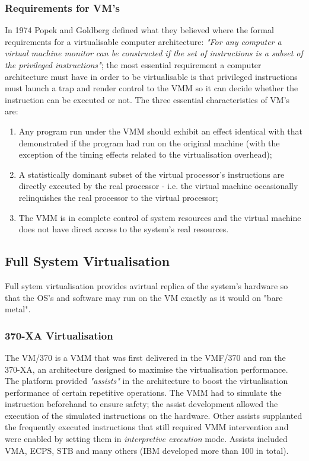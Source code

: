 \subsubsection{Requirements for VM's} 
In 1974 Popek and Goldberg defined what they believed where the formal requirements for a virtualisable computer
architecture: \textit{"For any computer a virtual machine monitor can be constructed if the set of instructions is a
subset of the privileged instructions"}; the most essential requirement a computer architecture must have in order to
be virtualisable is that privileged instructions must launch a trap and render control to the VMM so it can decide
whether the instruction can be executed or not. The three essential characteristics of VM's are:
\begin{enumerate}
    \item Any program run under the VMM should exhibit an effect identical with that demonstrated if the program had
        run on the original machine (with the exception of the timing effects related to the virtualisation overhead);
    \item A statistically dominant subset of the virtual processor's instructions are directly executed by the real
        processor - i.e. the virtual machine occasionally relinquishes the real processor to the virtual processor; 
    \item The VMM is in complete control of system resources and the virtual machine does not have direct access to the
        system's real resources.
\end{enumerate}
\subsection{Full System Virtualisation}
Full sytem virtualisation provides avirtual replica of the system's hardware so that the OS's and software may run on
the VM exactly as it would on "bare metal".
\subsubsection{370-XA Virtualisation}
The VM/370 is a VMM that was first delivered in the VMF/370 and ran the 370-XA, an architecture designed to maximise 
the virtualisation performance. The platform provided \textit{"assists"} in the architecture to boost the
virtualisation performance of certain repetitive operations. The VMM had to simulate the instruction beforehand to 
ensure safety; the assist development allowed the execution of the simulated instructions on the hardware. Other 
assists supplanted the frequently executed instructions that still required VMM intervention and were enabled by
setting them in \textit{interpretive execution} mode. Assists included VMA, ECPS, STB and many others (IBM developed
more than 100 in total).
